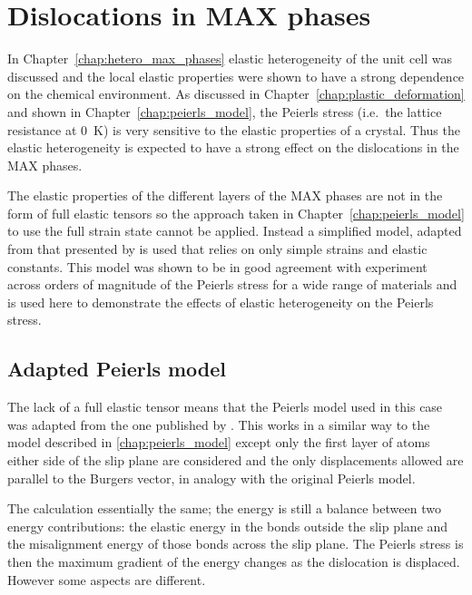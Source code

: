
\chapter{Dislocations in MAX phases}

\label{chap:dislocations_in_max_phases}
\graphicspath{{dislocations_in_max_phases/Figs/}}






In Chapter~\ref{chap:hetero_max_phases} elastic heterogeneity of the unit cell was discussed and the local elastic properties were shown to have a strong dependence on the chemical environment. As discussed in  Chapter~\ref{chap:plastic_deformation} and shown in Chapter~\ref{chap:peierls_model}, the Peierls stress (i.e.\ the lattice resistance at \SI{0}{\kelvin}) is very sensitive to the elastic properties of a crystal. Thus the elastic heterogeneity is expected to have a strong effect on the dislocations in the MAX phases.

The elastic properties of the different layers of the MAX phases are not in the form of full elastic tensors so the approach taken in Chapter~\ref{chap:peierls_model} to use the full strain state cannot be applied. Instead a simplified model, adapted from that presented by \citet{Clegg2006} is used that relies on only simple strains and elastic constants. This model was shown to be in good agreement with experiment across orders of magnitude of the Peierls stress for a wide range of materials and is used here to demonstrate the effects of elastic heterogeneity on the Peierls stress.


\section{Adapted Peierls model}

The lack of a full elastic tensor means that the Peierls model used in this case was adapted from the one published by \cite{Clegg2006}. This works in a similar way to the model described in \ref{chap:peierls_model} except only the first layer of atoms either side of the slip plane are considered and the only displacements allowed are parallel to the Burgers vector, in analogy with the original Peierls model.

The calculation essentially the same; the energy is still a balance between two energy contributions: the elastic energy in the bonds outside the slip plane and the misalignment energy of those bonds across the slip plane. The Peierls stress is then the maximum gradient of the energy changes as the dislocation is displaced. However some aspects are different.


